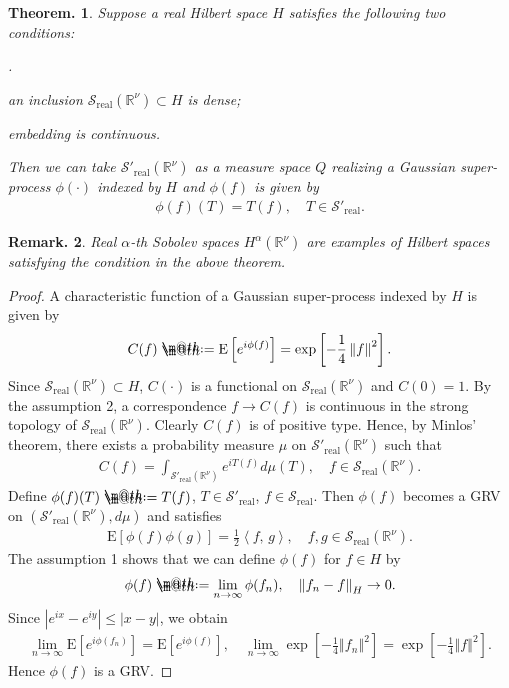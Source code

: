 \documentclass[openany, a4paper, oneside]{jsbook}
\makeatletter
\newcounter{enum2}
\renewenvironment{enumerate}{%
\begin{list}%
{%
\arabic{enum2}.\ \,%
}%
{%
\usecounter{enum2}
\setlength{\itemindent}{0pt}%
\setlength{\leftmargin}{15pt}%
\setlength{\rightmargin}{0pt}%
\setlength{\labelsep}{0pt}%
\setlength{\labelwidth}{6pt}%
\setlength{\itemsep}{0pt}%
\setlength{\parsep}{0pt}%
\setlength{\listparindent}{0pt}%
}
}{%
\end{list}%
}
\newcommand*{\defeq}{\mathrel{\rlap{%
\raisebox{0.3ex}{$\m@th\cdot$}}%
\raisebox{-0.3ex}{$\m@th\cdot$}}%
=}
\theoremstyle{break}
\theoremstyle{breakdefn}
\newtheorem{thm}{Theorem.}[section]
\newtheorem{rem}[thm]{Remark.}
\newcommand{\abs}[1]{\left|#1\right|}
\newcommand{\norm}[1]{\left\Vert#1\right\Vert}
\newcommand{\sqbk}[1]{\left[#1\right]}
\newcommand{\bkt}[2]{\left\langle#1,\,#2\right\rangle}
\newcommand{\bbRnu}{\mathbb{R}^{\nu}}
\newcommand{\E}[1]{\rmE\sqbk{#1}}
\newcommand{\realtempereddist}{\mathcal{S}'_{\mathrm{real}}}
\newcommand{\realrapiddecrease}{\mathcal{S}_{\mathrm{real}}}
\newcommand{\rmE}{\mathrm{E}}
\makeatother
\begin{document}
\begin{thm}
 Suppose a real Hilbert space $H$ satisfies the following two conditions:
\begin{enumerate}
\item an inclusion $\realrapiddecrease (\bbRnu) \subset H$ is dense;
\item embedding is continuous.
\end{enumerate}
 Then we can take $\realtempereddist (\bbRnu)$ as a measure space $Q$ realizing a Gaussian super-process $\phi (\cdot)$ indexed by $H$
 and $\phi (f)$ is given by
 \begin{align}
  \phi (f) (T) = T (f), \quad T \in \realtempereddist.
 \end{align}
\end{thm}
\begin{rem}
 Real $\alpha$-th Sobolev spaces $H^{\alpha}(\bbRnu)$ are examples of Hilbert spaces satisfying the condition in the above theorem.
\end{rem}
\begin{proof}
 A characteristic function of a Gaussian super-process indexed by $H$ is given by
 \begin{align}
  C (f) \defeq \E{e^{i \phi (f)}} = \exp \sqbk{- \frac{1}{4} \norm{f}^2}.
 \end{align}
 Since $\realrapiddecrease (\bbRnu) \subset H$, $C (\cdot)$ is a functional on $\realrapiddecrease (\bbRnu)$ and $C (0)=1$.
 By the assumption 2, a correspondence $f \to C (f)$ is continuous in the strong topology of $\realrapiddecrease (\bbRnu)$.
 Clearly $C (f)$ is of positive type.
 Hence, by Minlos' theorem, there exists a probability measure $\mu$ on $\realtempereddist (\bbRnu)$ such that
 \begin{align}
  C (f) = \int_{\realtempereddist (\bbRnu)} e^{i T (f)} d \mu (T), \quad f \in \realrapiddecrease (\bbRnu).
 \end{align}
 Define $\phi (f) (T) \defeq T (f)$, $T \in \realtempereddist$, $f \in \realrapiddecrease$.
 Then $\phi (f)$ becomes a GRV on $(\realtempereddist (\bbRnu), d \mu)$ and satisfies
 \begin{align}
  \E{\phi (f) \phi (g)} = \frac{1}{2} \bkt{f}{g}, \quad f, g \in \realrapiddecrease (\bbRnu).
 \end{align}
 The assumption 1 shows that we can define $\phi (f)$ for $f \in H$ by
 \begin{align}
  \phi (f) \defeq \lim_{n \to \infty} \phi (f_n), \quad \norm{f_n - f}_{H} \to 0.
 \end{align}
 Since $\abs{e^{ix} - e^{iy}} \leq \abs{x - y}$, we obtain
 \begin{align}
  \lim_{n \to \infty} \E{e^{i \phi (f_n)}}
  =
  \E{e^{i \phi (f)}}, \quad
  \lim_{n \to \infty} \exp \sqbk{- \frac{1}{4} \norm{f_n}^2}
  =
  \exp \sqbk{- \frac{1}{4} \norm{f}^2}.
 \end{align}
 Hence $\phi (f)$ is a GRV.
\end{proof}
\end{document}
